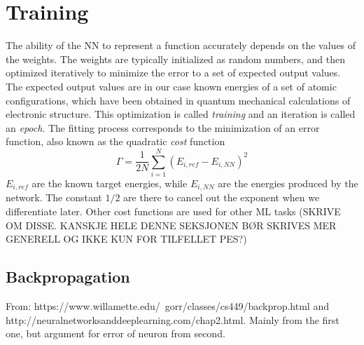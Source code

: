 \documentclass[twoside,english]{uiofysmaster}
\begin{document}
\section{Training}
The ability of the NN to represent a function accurately depends on the values of the weights. 
The weights are typically initialized as random numbers, and then optimized iteratively to minimize the error
to a set of expected output values. The expected output values are in our case known energies of a set of atomic
configurations, which have been obtained in quantum mechanical calculations of electronic structure. 
This optimization is called \textit{training} and an iteration is called an \textit{epoch}. 
The fitting process corresponds to the minimization of an error function, also known as the quadratic \textit{cost} function
\begin{equation}
 \Gamma = \frac{1}{2N}\sum_{i=1}^N (E_{i,ref} - E_{i,NN})^2
 \label{quadraticCostFunction}
\end{equation}
$E_{i,ref}$ are the known target energies, while $E_{i,NN}$ are the energies produced by the network. 
The constant $1/2$ are there to cancel out the exponent when we differentiate later. 
Other cost functions are used for other ML tasks (SKRIVE OM DISSE. KANSKJE HELE DENNE SEKSJONEN BØR 
SKRIVES MER GENERELL OG IKKE KUN FOR TILFELLET PES?)

\subsection{Backpropagation} \label{sec:backprop}
From: https://www.willamette.edu/~gorr/classes/cs449/backprop.html and \newline
http://neuralnetworksanddeeplearning.com/chap2.html. 
Mainly from the first one, but argument for error of neuron from second.
\end{document}

